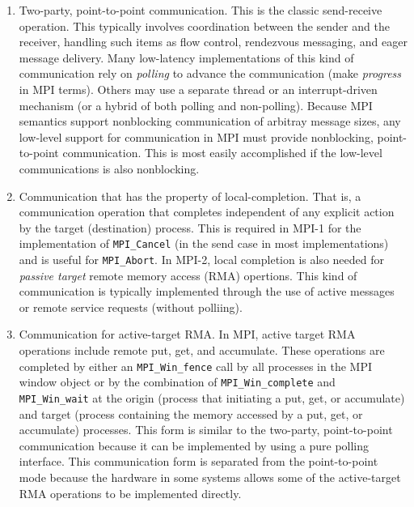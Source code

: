 \documentclass{article}
\def\code#1{\texttt{#1}}
\begin{document}
\begin{enumerate}
\item Two-party, point-to-point communication.  This is the classic
send-receive operation.  This typically involves coordination between
the sender and the receiver, handling such items as flow control,
rendezvous messaging, and eager message delivery.  Many low-latency
implementations of this kind of communication rely on \emph{polling}
to advance the communication (make \emph{progress} in MPI terms).
Others may use a separate thread or an interrupt-driven mechanism (or
a hybrid of both polling and non-polling). 
Because MPI semantics support nonblocking communication of arbitray
message sizes, any low-level support for communication in MPI must
provide nonblocking, point-to-point communication.  This is most
easily accomplished if the low-level communications is also
nonblocking.

\item Communication that has the property of local-completion. That
is, a communication operation that completes independent of any
explicit action by the target (destination) process.  This is required
in MPI-1 for the implementation of \code{MPI_Cancel} (in the send
case in most implementations) and is useful for \code{MPI_Abort}.
In MPI-2, local completion is also needed for \emph{passive target}
remote memory access (RMA) opertions.  This kind of communication is
typically implemented through the use of active messages or remote
service requests (without polliing).

\item Communication for active-target RMA.  In MPI, active target RMA
operations include remote put, get, and accumulate.  These operations
are completed by either an \code{MPI_Win_fence} call by all processes
in the MPI window object or by the combination of
\code{MPI_Win_complete} and \code{MPI_Win_wait} at the origin (process
that initiating a put, get, or accumulate) and target (process
containing the memory accessed by a put, get, or accumulate)
processes.  This form is similar to the two-party, point-to-point
communication because it can be implemented by using a pure polling
interface. This communication form is separated from the point-to-point
mode because the hardware in some systems allows some of the
active-target RMA operations to be implemented directly.


\end{enumerate}
\end{document}
